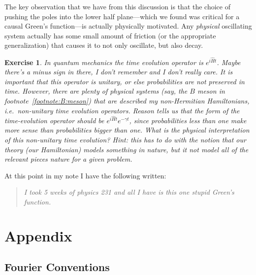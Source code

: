 \documentclass[
  11pt,
	colorful,
	raggedright,
]{tufte-style-thesis-flip}
\newtheorem{exercise}{Exercise}[section]
\begin{document}
 The key observation that we have from this discussion is that the choice of pushing the poles into the lower half plane---which we found was critical for a causal Green's function---is actually physically motivated. Any \emph{physical} oscillating system actually has some small amount of friction (or the appropriate generalization) that causes it to not only oscillate, but also decay. 
 \begin{exercise}
 In quantum mechanics the time evolution operator is $e^{i\hat H t}$. Maybe there's a minus sign in there, I don't remember and I don't really care. It is important that this operator is unitary, or else probabilities are not preserved in time. However, there are plenty of physical systems (say, the $B$ meson in footnote~\ref{footnote:B:meson}) that \emph{are} described my non-Hermitian Hamiltonians, i.e.~non-unitary time evolution operators. Reason tells us that the form of the time-evolution operator should be $e^{i\hat H t}e^{-\gamma t}$, since probabilities less than one make more sense than probabilities bigger than one. What is the physical interpretation of this non-unitary time evolution? Hint: this has to do with the notion that our theory (our Hamiltonian) models something in nature, but it not model \emph{all} of the relevant pieces nature for a given problem.
 \end{exercise}
 At this point in my note I have the following written:
 \begin{quote}
 \emph{I took 5 weeks of physics 231 and all I have is this one stupid Green's function.}
 \end{quote}
 
 
 














\part*{Appendix}
\appendix



\chapter{Fourier Conventions}
\label{app:Fourier}
\end{document}
